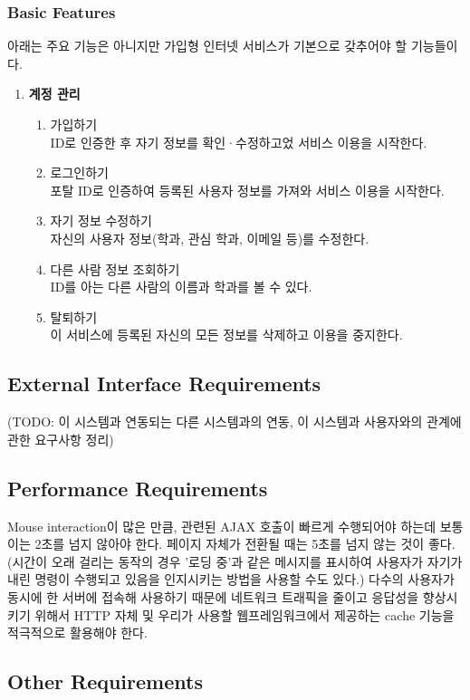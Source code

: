 \documentclass[a4paper,titlepage]{article}
\begin{document}
\subsubsection{Basic Features}
아래는 주요 기능은 아니지만 가입형 인터넷 서비스가 기본으로 갖추어야 할 기능들이다.
\begin{enumerate}
	\item\textbf{계정 관리}
	\begin{enumerate}
		\item 가입하기\\
		ID로 인증한 후 자기 정보를 확인·수정하고었 서비스 이용을 시작한다. 
		\item 로그인하기\\ 
		포탈 ID로 인증하여 등록된 사용자 정보를 가져와 서비스 이용을 시작한다. 
		\item 자기 정보 수정하기\\
		자신의 사용자 정보(학과, 관심 학과, 이메일 등)를 수정한다. 
		\item 다른 사람 정보 조회하기\\
		ID를 아는 다른 사람의 이름과 학과를 볼 수 있다. 
		\item 탈퇴하기\\
		이 서비스에 등록된 자신의 모든 정보를 삭제하고 이용을 중지한다. 
	\end{enumerate}
\end{enumerate}

\subsection{External Interface Requirements}
(TODO: 이 시스템과 연동되는 다른 시스템과의 연동, 이 시스템과 사용자와의 관계에 관한 요구사항 정리)

\subsection{Performance Requirements}
Mouse interaction이 많은 만큼, 관련된 AJAX 호출이 빠르게 수행되어야 하는데 보통 이는 2초를 넘지 않아야 한다.
페이지 자체가 전환될 때는 5초를 넘지 않는 것이 좋다.
(시간이 오래 걸리는 동작의 경우 '로딩 중'과 같은 메시지를 표시하여 사용자가 자기가 내린 명령이 수행되고 있음을 인지시키는 방법을 사용할 수도 있다.)
다수의 사용자가 동시에 한 서버에 접속해 사용하기 때문에 네트워크 트래픽을 줄이고 응답성을 향상시키기 위해서 HTTP 자체 및 우리가 사용할 웹프레임워크에서 제공하는 cache 기능을 적극적으로 활용해야 한다.

\subsection{Other Requirements}
\end{document}
